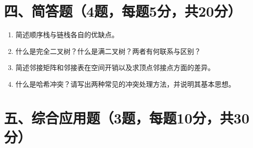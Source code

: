 \documentclass{../../note}
\begin{document}
\section*{四、简答题（4题，每题5分，共20分）}

\begin{enumerate}[itemsep=1em]
\item 简述顺序栈与链栈各自的优缺点。
\item 什么是完全二叉树？什么是满二叉树？两者有何联系与区别？
\item 简述邻接矩阵和邻接表在空间开销以及求顶点邻接点方面的差异。
\item 什么是哈希冲突？请写出两种常见的冲突处理方法，并说明其基本思想。
\end{enumerate}

\section*{五、综合应用题（3题，每题10分，共30分）}
\end{document}
